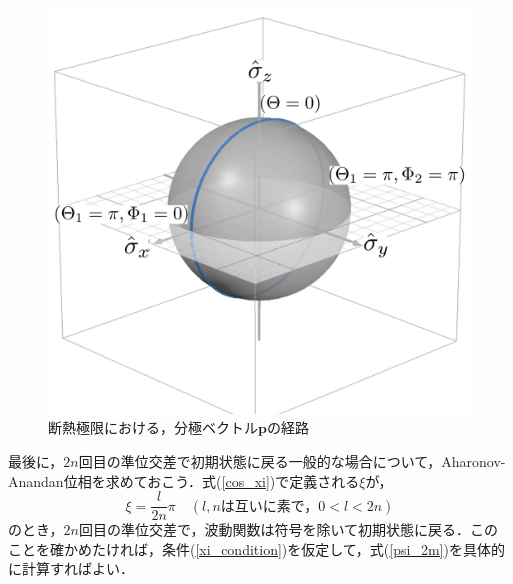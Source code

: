 \begin{figure}[htbp]
  \centering
  \includegraphics[scale=0.5]{figures/AAP_2.png}
  \caption{断熱極限における，分極ベクトル$\bm{p}$の経路}
  \label{fig:AAP_2}
\end{figure}


最後に，$2n$回目の準位交差で初期状態に戻る一般的な場合について，Aharonov-Anandan位相を求めておこう．式(\ref{cos_xi})で定義される$\xi$が，
\begin{equation}
  \xi = \frac{l}{2n} \pi \quad (l,n \text{は互いに素で，}0 < l < 2n) \label{xi_condition}
\end{equation}
のとき，$2n$回目の準位交差で，波動関数は符号を除いて初期状態に戻る．このことを確かめたければ，条件(\ref{xi_condition})を仮定して，式(\ref{psi_2m})を具体的に計算すればよい．


